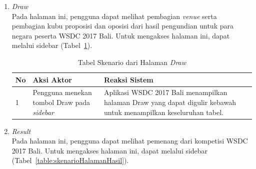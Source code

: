 \begin{enumerate}
	\item {\it Draw} \\ 
	Pada halaman ini, pengguna dapat melihat pembagian {\it venue} serta pembagian kubu proposisi dan oposisi dari hasil pengundian untuk para negara peserta WSDC 2017 Bali. Untuk mengakses halaman ini, dapat melalui sidebar (Tabel~\ref{table:skenarioHalamanDraw}).
		\begin{table}[H]
			\centering
			\begin{tabular}{|p{0.5cm}|p{7cm}|p{7cm}|}
				\hline
				No & Aksi Aktor                               & Reaksi Sistem                                          \\ \hline
				1  & Pengguna menekan tombol Draw pada \textit{sidebar} & Aplikasi WSDC 2017 Bali menampilkan halaman Draw yang dapat digulir kebawah untuk menampilkan keseluruhan tabel. \\ \hline
			\end{tabular}
			\caption{Tabel Skenario dari Halaman {\it Draw}}
			\label{table:skenarioHalamanDraw}
		\end{table}
	\item \textit{Result} \\ 
	Pada halaman ini, pengguna dapat melihat pemenang dari kompetisi WSDC 2017 Bali. Untuk mengakses halaman ini, dapat melalui sidebar (Tabel~\ref{table:skenarioHalamanHasil}).

\end{enumerate}

